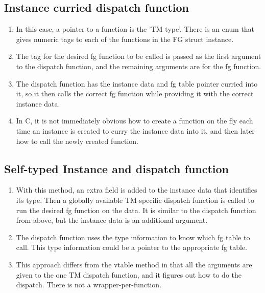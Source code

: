 \documentclass[11pt]{article}
\begin{document}
\subsection{Instance curried dispatch function}
\label{sec:orga7d5cdc}

\begin{enumerate}
\item In this case, a pointer to a function is the 'TM type'. There is an enum that gives numeric tags to each of the functions in the FG struct instance.

\item The tag for the desired fg function to be called is passed as the first argument to the dispatch function, and the remaining arguments are for the fg function.

\item The dispatch function has the instance data and fg table pointer curried into it, so it then calls the correct fg function while providing it with the correct instance data.

\item In C, it is not immediately obvious how to create a function on the fly each time an
instance is created to curry the instance data into it, and then later how to call
the newly created function.
\end{enumerate}

\subsection{Self-typed Instance and dispatch function}
\label{sec:orge6b7e0a}

\begin{enumerate}
\item With this method, an extra field is added to the instance data that identifies its type. Then a globally available TM-specific dispatch function is called to run the desired fg function on the data. It is similar to the dispatch function from above, but the instance data is an additional argument.

\item The dispatch function uses the type information to know which fg table to call. This type information could be a pointer to the appropriate fg table.

\item This approach differs from the vtable method in that all the arguments are given to the one TM dispatch function, and it figures out how to do the dispatch. There is not a wrapper-per-function.
\end{enumerate}
\end{document}
